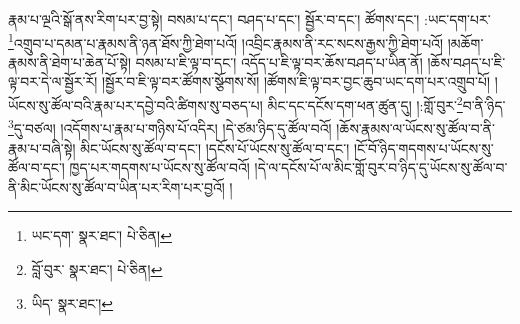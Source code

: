རྣམ་པ་ལྔའི་སྒོ་ནས་རིག་པར་བྱ་སྟེ། བསམ་པ་དང་། བཤད་པ་དང་། སྦྱོར་བ་དང་། ཚོགས་དང་། :ཡང་དག་པར་\footnote{ཡང་དག་  སྣར་ཐང་།  པེ་ཅིན། }འགྲུབ་པ་དམན་པ་རྣམས་ནི་ཉན་ཐོས་ཀྱི་ཐེག་པའོ། །འབྲིང་རྣམས་ནི་རང་སངས་རྒྱས་ཀྱི་ཐེག་པའོ། །མཆོག་རྣམས་ནི་ཐེག་པ་ཆེན་པོ་སྟེ། བསམ་པ་ཇི་ལྟ་བ་དང་། འདོད་པ་ཇི་ལྟ་བར་ཆོས་བཤད་པ་ཡིན་ནོ། །ཆོས་བཤད་པ་ཇི་ལྟ་བར་དེ་ལ་སྦྱོར་རོ། །སྦྱོར་བ་ཇི་ལྟ་བར་ཚོགས་སྩོགས་སོ། །ཚོགས་ཇི་ལྟ་བར་བྱང་ཆུབ་ཡང་དག་པར་འགྲུབ་པོ། །ཡོངས་སུ་ཚོལ་བའི་རྣམ་པར་དབྱེ་བའི་ཚིགས་སུ་བཅད་པ། མིང་དང་དངོས་དག་ཕན་ཚུན་དུ། །:གློ་བུར་\footnote{བློ་བུར་  སྣར་ཐང་།  པེ་ཅིན། }བ་ནི་ཉིད་\footnote{ཡིད་  སྣར་ཐང་། }དུ་བཙལ། །འདོགས་པ་རྣམ་པ་གཉིས་པོ་འདིར། །དེ་ཙམ་ཉིད་དུ་ཚོལ་བའོ། །ཆོས་རྣམས་ལ་ཡོངས་སུ་ཚོལ་བ་ནི་རྣམ་པ་བཞི་སྟེ། མིང་ཡོངས་སུ་ཚོལ་བ་དང་། །དངོས་པོ་ཡོངས་སུ་ཚོལ་བ་དང་། །ངོ་བོ་ཉིད་གདགས་པ་ཡོངས་སུ་ཚོལ་བ་དང་། ཁྱད་པར་གདགས་པ་ཡོངས་སུ་ཚོལ་བའོ། །དེ་ལ་དངོས་པོ་ལ་མིང་གློ་བུར་བ་ཉིད་དུ་ཡོངས་སུ་ཚོལ་བ་ནི་མིང་ཡོངས་སུ་ཚོལ་བ་ཡིན་པར་རིག་པར་བྱའོ། །
